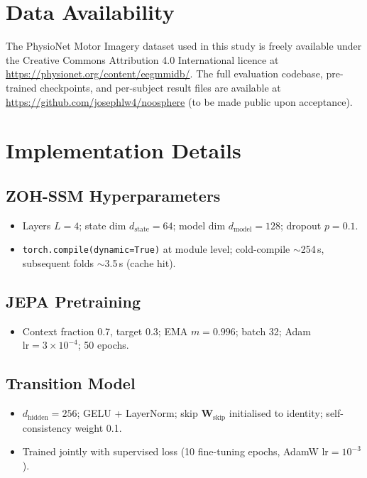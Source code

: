 \documentclass[journal]{IEEEtran}
\begin{document}
\section*{Data Availability}
The PhysioNet Motor Imagery dataset used in this study is freely available under the Creative Commons Attribution 4.0 International licence at \url{https://physionet.org/content/eegmmidb/}.
The full evaluation codebase, pre-trained checkpoints, and per-subject result files are available at \url{https://github.com/josephlw4/noosphere} (to be made public upon acceptance).

\appendix
\section{Implementation Details}
\label{app:impl}

\subsection{ZOH-SSM Hyperparameters}
\begin{itemize}
  \item Layers $L=4$; state dim $d_\text{state}=64$; model dim $d_\text{model}=128$; dropout $p=0.1$.
  \item \texttt{torch.compile(dynamic=True)} at module level; cold-compile $\sim$254\,s, subsequent folds $\sim$3.5\,s (cache hit).
\end{itemize}

\subsection{JEPA Pretraining}
\begin{itemize}
  \item Context fraction 0.7, target 0.3; EMA $m=0.996$; batch 32; Adam $\text{lr}=3\times10^{-4}$; 50 epochs.
\end{itemize}

\subsection{Transition Model}
\begin{itemize}
  \item $d_\text{hidden}=256$; GELU + LayerNorm; skip $\mathbf{W}_\text{skip}$ initialised to identity; self-consistency weight 0.1.
  \item Trained jointly with supervised loss (10 fine-tuning epochs, AdamW $\text{lr}=10^{-3}$).
\end{itemize}
\end{document}
